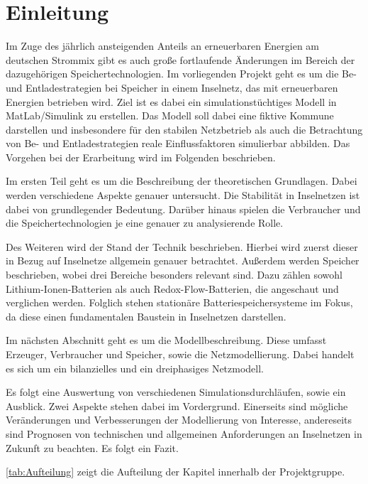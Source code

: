 \chapter{Einleitung}

Im Zuge des jährlich ansteigenden Anteils an erneuerbaren Energien am deutschen Strommix gibt es auch große fortlaufende Änderungen im Bereich der dazugehörigen Speichertechnologien. 
Im vorliegenden Projekt geht es um die Be- und Entladestrategien bei Speicher in einem Inselnetz, das mit erneuerbaren Energien betrieben wird. 
Ziel ist es dabei ein simulationstüchtiges Modell in MatLab/Simulink zu erstellen. 
Das Modell soll dabei eine fiktive Kommune darstellen und insbesondere für den stabilen Netzbetrieb als auch die Betrachtung von Be- und Entladestrategien reale Einflussfaktoren simulierbar abbilden.
Das Vorgehen bei der Erarbeitung wird im Folgenden beschrieben.

Im ersten Teil geht es um die Beschreibung der theoretischen Grundlagen. 
Dabei werden verschiedene Aspekte genauer untersucht.
Die Stabilität in Inselnetzen ist dabei von grundlegender Bedeutung.
Darüber hinaus spielen die Verbraucher und die Speichertechnologien je eine genauer zu analysierende Rolle.

Des Weiteren wird der Stand der Technik beschrieben.
Hierbei wird zuerst dieser in Bezug auf Inselnetze allgemein genauer betrachtet.
Außerdem werden Speicher beschrieben, wobei drei Bereiche besonders relevant sind.
Dazu zählen sowohl Lithium-Ionen-Batterien als auch Redox-Flow-Batterien, die angeschaut und verglichen werden. 
Folglich stehen stationäre Batteriespeichersysteme im Fokus, da diese einen fundamentalen Baustein in Inselnetzen darstellen.

Im nächsten Abschnitt geht es um die Modellbeschreibung.
Diese umfasst Erzeuger, Verbraucher und Speicher, sowie die Netzmodellierung.
Dabei handelt es sich um ein bilanzielles und ein dreiphasiges Netzmodell.

Es folgt eine Auswertung von verschiedenen Simulationsdurchläufen, sowie ein Ausblick.
Zwei Aspekte stehen dabei im Vordergrund.
Einerseits sind mögliche Veränderungen und Verbesserungen der Modellierung von Interesse, andereseits sind Prognosen von technischen und allgemeinen Anforderungen an Inselnetzen in Zukunft zu beachten.
Es folgt ein Fazit.

\autoref{tab:Aufteilung} zeigt die Aufteilung der Kapitel innerhalb der Projektgruppe.

